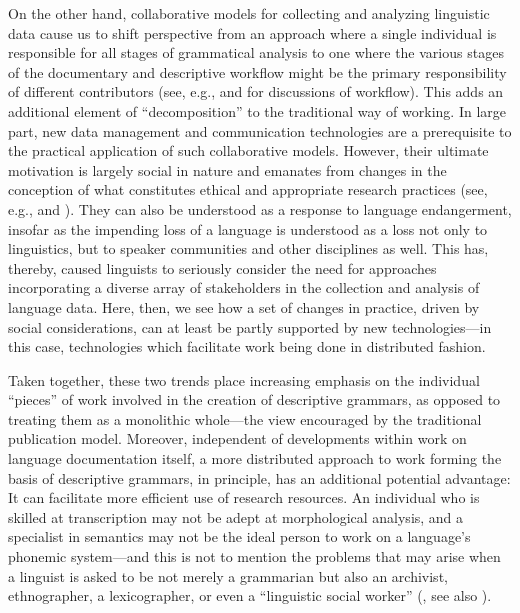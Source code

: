 On the other hand, collaborative models for collecting and analyzing linguistic
data cause us to shift perspective from an approach where a single individual is
responsible for all stages of grammatical analysis to one where the various
stages of the documentary and descriptive workflow might be the primary
responsibility of different contributors (see, e.g., 
and  for discussions of workflow). This adds an
additional element of ``decomposition'' to the traditional way of working. In
large part, new data management and communication technologies are a
prerequisite to the practical application of such collaborative models. However,
their ultimate motivation is largely social in nature and emanates from changes
in the conception of what constitutes ethical and appropriate research practices
(see, e.g.,  and
). They can also be understood as a
response to language endangerment, insofar as the impending loss of a language
is understood as a loss not only to linguistics, but to speaker communities and
other disciplines as well. This has, thereby, caused linguists to seriously
consider the need for approaches incorporating a diverse array of stakeholders
in the collection and analysis of language data. Here, then, we see how a set of
changes in practice, driven by social considerations, can at least be partly
supported by new technologies---in this case, technologies which facilitate work
being done in distributed fashion.

Taken together, these two trends place increasing emphasis on the individual
``pieces'' of work involved in the creation of descriptive grammars, as opposed
to treating them as a monolithic whole---the view encouraged by the traditional
publication model. Moreover, independent of developments within work on language
documentation itself, a more distributed approach to work forming the basis of
descriptive grammars, in principle, has an additional potential advantage: It
can facilitate more efficient use of research resources. An individual who is
skilled at transcription may not be adept at morphological analysis, and a
specialist in semantics may not be the ideal person to work on a language's
phonemic system---and this is not to mention the problems that may arise when a
linguist is asked to be not merely a grammarian but also an archivist,
ethnographer, a lexicographer, or even a ``linguistic social worker''
(\citet[14--17]{Newman:1998}, see also \citet[342--343]{Evans:2008}).

